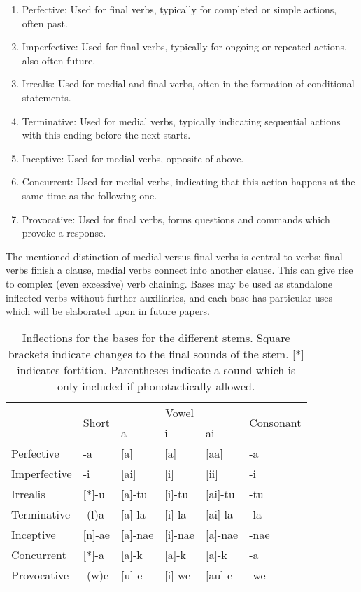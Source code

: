 \begin{enumerate}
	\item Perfective: Used for final verbs, typically for completed or simple actions, often past.
	\item Imperfective: Used for final verbs, typically for ongoing or repeated actions, also often future.
	\item Irrealis: Used for medial and final verbs, often in the formation of conditional statements.
	\item Terminative: Used for medial verbs, typically indicating sequential actions with this ending before the next starts.
	\item Inceptive: Used for medial verbs, opposite of above.
	\item Concurrent: Used for medial verbs, indicating that this action happens at the same time as the following one.
	\item Provocative: Used for final verbs, forms questions and commands which provoke a response.
\end{enumerate}

The mentioned distinction of medial versus final verbs is central to \lang{} verbs: final verbs finish a clause, medial verbs connect into another clause. This can give rise to complex (even excessive) verb chaining. Bases may be used as standalone inflected verbs without further auxiliaries, and each base has particular uses which will be elaborated upon in future papers.

\begin{table}[H]
\centering
\begin{tabular}{l|l|lll|l}
\multirow{2}{*}{} & \multirow{2}{*}{Short} & \multicolumn{3}{c|}{Vowel}  & \multirow{2}{*}{Consonant} \\
                  &                        & a       & i       & ai      &                            \\ \hline
Perfective        & -a                     & [a]     & [a]     & [aa]    & -a                         \\
Imperfective      & -i                     & [ai]    & [i]     & [ii]    & -i                         \\
Irrealis          & [*]-u                  & [a]-tu  & [i]-tu  & [ai]-tu & -tu                        \\
Terminative       & -(l)a                  & [a]-la  & [i]-la  & [ai]-la & -la                        \\
Inceptive         & [n]-ae                 & [a]-nae & [i]-nae & [a]-nae & -nae                       \\
Concurrent        & [*]-a                  & [a]-k   & [a]-k   & [a]-k   & -a                         \\
Provocative       & -(w)e                  & [u]-e   & [i]-we  & [au]-e  & -we                       
\end{tabular}
\label{base-inflections}
\caption{Inflections for the bases for the different stems. Square brackets indicate changes to the final sounds of the stem. [*] indicates fortition. Parentheses indicate a sound which is only included if phonotactically allowed.}
\end{table}

